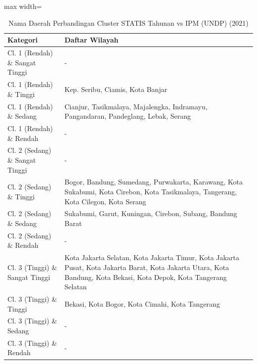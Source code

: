 \begin{table}[H]
\centering
\caption{Nama Daerah Perbandingan Cluster STATIS Tahunan vs IPM (UNDP) (2021)} \label{tab:app1statis_ipm_name_2021}
\begin{adjustbox}{max width=\textwidth}
\begin{tabular}{|p{4cm}|p{10cm}|}
\hline
\textbf{Kategori} & \textbf{Daftar Wilayah} \\
\hline
Cl. 1 (Rendah) \& Sangat Tinggi & - \\
\hline
Cl. 1 (Rendah) \& Tinggi & Kep. Seribu, Ciamis, Kota Banjar \\
\hline
Cl. 1 (Rendah) \& Sedang & Cianjur, Tasikmalaya, Majalengka, Indramayu, Pangandaran, Pandeglang, Lebak, Serang \\
\hline
Cl. 1 (Rendah) \& Rendah & - \\
\hline
Cl. 2 (Sedang) \& Sangat Tinggi & - \\
\hline
Cl. 2 (Sedang) \& Tinggi & Bogor, Bandung, Sumedang, Purwakarta, Karawang, Kota Sukabumi, Kota Cirebon, Kota Tasikmalaya, Tangerang, Kota Cilegon, Kota Serang \\
\hline
Cl. 2 (Sedang) \& Sedang & Sukabumi, Garut, Kuningan, Cirebon, Subang, Bandung Barat \\
\hline
Cl. 2 (Sedang) \& Rendah & - \\
\hline
Cl. 3 (Tinggi) \& Sangat Tinggi & Kota Jakarta Selatan, Kota Jakarta Timur, Kota Jakarta Pusat, Kota Jakarta Barat, Kota Jakarta Utara, Kota Bandung, Kota Bekasi, Kota Depok, Kota Tangerang Selatan \\
\hline
Cl. 3 (Tinggi) \& Tinggi & Bekasi, Kota Bogor, Kota Cimahi, Kota Tangerang \\
\hline
Cl. 3 (Tinggi) \& Sedang & - \\
\hline
Cl. 3 (Tinggi) \& Rendah & - \\
\hline
\end{tabular}
\end{adjustbox}
\end{table}